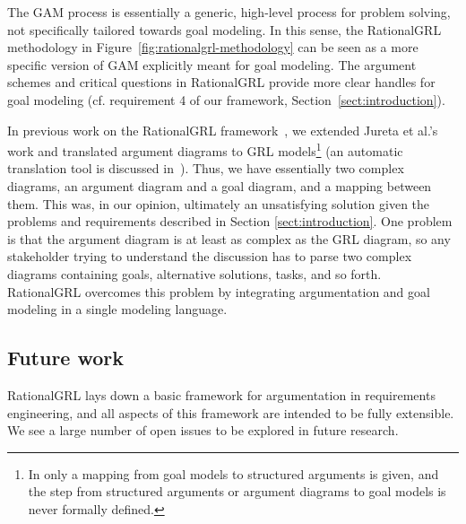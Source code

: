 The GAM process is essentially a generic, high-level process for problem solving, not specifically tailored towards goal modeling. In this sense, the RationalGRL methodology in Figure~\ref{fig:rationalgrl-methodology} can be seen as a more specific version of GAM explicitly meant for goal modeling. The argument schemes and critical questions in RationalGRL provide more clear handles for goal modeling (cf. requirement 4 of our framework, Section~\ref{sect:introduction}).  

In previous work on the RationalGRL framework~\cite{vanzee-etal:renext2015,vanZee-etal:er2016}, we extended Jureta et al.'s work and translated argument diagrams to GRL models\footnote{In \cite{Jureta:RE2008} only a mapping from goal models to structured arguments is given, and the step from structured arguments or argument diagrams to goal models is never formally defined.} (an automatic translation tool is discussed in~\cite{vanZee-etal:er2016}). Thus, we have essentially two complex diagrams, an argument diagram and a goal diagram, and a mapping between them. This was, in our opinion, ultimately an unsatisfying solution given the problems and requirements described in Section \ref{sect:introduction}. One problem is that the argument diagram is at least as complex as the GRL diagram, so any stakeholder trying to understand the discussion has to parse two complex diagrams containing goals, alternative solutions, tasks, and so forth. RationalGRL overcomes this problem by integrating argumentation and goal modeling in a single modeling language.

\subsection{Future work}
\label{sect:discussion:futurework}

RationalGRL lays down a basic framework for argumentation in requirements engineering, and all aspects of this framework are intended to be fully extensible. We see a large number of open issues to be explored in future research.

